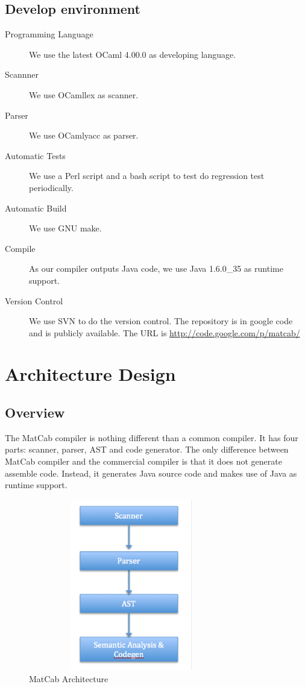 \documentclass[12pt]{article} %
\begin{document}
\subsection{Develop environment}
\begin{description}
\item[Programming Language] We use the latest OCaml 4.00.0 as developing language. 
\item[Scannner] We use OCamllex as scanner.  
\item[Parser] We use OCamlyacc as parser. 
\item[Automatic Tests] We use a Perl script and a bash script to test do regression test periodically. 
\item[Automatic Build] We use GNU make.
\item[Compile] As our compiler outputs Java code, we use Java 1.6.0\_35 as runtime support.
\item[Version Control] We use SVN to do the version control. The repository is in google code and is publicly available. The URL is  \url{http://code.google.com/p/matcab/} 
\end{description}



\section{Architecture Design}
\subsection{Overview}
The MatCab compiler is nothing different than a common compiler. It has four parts: scanner, parser, AST and code generator. The only difference between MatCab compiler and the commercial compiler is that it does not generate assemble code. Instead, it generates Java source code and makes use of Java as runtime support.
 \begin{figure}[!h] 
     \centering   
     \includegraphics[width=9cm, height=7.5cm]{arch.png} 
     \caption{\label{lb}MatCab Architecture} 
\end{figure}
\end{document}
